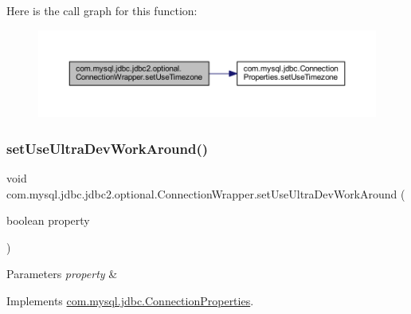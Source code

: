 Here is the call graph for this function\+:
\nopagebreak
\begin{figure}[H]
\begin{center}
\leavevmode
\includegraphics[width=350pt]{classcom_1_1mysql_1_1jdbc_1_1jdbc2_1_1optional_1_1_connection_wrapper_aceb697ff05de0e9bcd43256ff2a7d47a_cgraph}
\end{center}
\end{figure}
\mbox{\label{classcom_1_1mysql_1_1jdbc_1_1jdbc2_1_1optional_1_1_connection_wrapper_a975975f724eda5350e1b096e2525a70c}} 
\subsubsection{\texorpdfstring{set\+Use\+Ultra\+Dev\+Work\+Around()}{setUseUltraDevWorkAround()}}
{\footnotesize\ttfamily void com.\+mysql.\+jdbc.\+jdbc2.\+optional.\+Connection\+Wrapper.\+set\+Use\+Ultra\+Dev\+Work\+Around (\begin{DoxyParamCaption}\item[{boolean}]{property }\end{DoxyParamCaption})}


\begin{DoxyParams}{Parameters}
{\em property} & \\
\hline
\end{DoxyParams}


Implements \mbox{\hyperlink{interfacecom_1_1mysql_1_1jdbc_1_1_connection_properties_af0a84465de479a1eea05763a2ae4cc37}{com.\+mysql.\+jdbc.\+Connection\+Properties}}.

